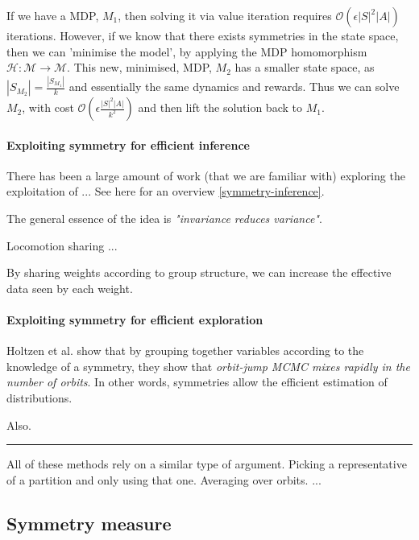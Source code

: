 If we have a MDP, $M_1$, then solving it via value iteration requires $\mathcal O(\epsilon |S|^2|A|)$ iterations.
However, if we know that there exists symmetries in the state space, then we can 'minimise the model',
by applying the MDP homomorphism $\mathcal H: \mathcal M\to \mathcal M$.
This new, minimised, MDP, $M_2$ has a smaller state space, as $|S_{M_2}| = \frac{|S_{M_1}|}{k}$
and essentially the same dynamics and rewards. Thus we can solve $M_2$, with cost $\mathcal O(\epsilon \frac{|S|^2|A|}{k^2})$
and then lift the solution back to $M_1$. \cite{Dean1997, NARAYANAMURTHY}


\paragraph{Exploiting symmetry for efficient inference}

There has been a large amount of work (that we are familiar with) exploring
the exploitation of ... See  here for an overview \ref{symmetry-inference}.

The general essence of the idea is \textit{"invariance reduces variance"}. \cite{Chen2019}

Locomotion sharing ... \cite{Abdolhosseini}

By sharing weights according to group structure\cite{Ravanbakhsh2017a}, we can increase the effective data seen by each weight.

\paragraph{Exploiting symmetry for efficient exploration}

Holtzen et al. \cite{Holtzen2019} show that by grouping together variables according to
the knowledge of a symmetry, they show that \textit{orbit-jump MCMC mixes rapidly in the number of orbits}.
In other words, symmetries allow the efficient estimation of distributions.

Also. \cite{Campbell2019}

\begin{center}\rule{0.5\linewidth}{\linethickness}\end{center}

All of these methods rely on a similar type of argument. Picking a representative
of a partition and only using that one. Averaging over orbits. ...

\subsection{Symmetry measure}

